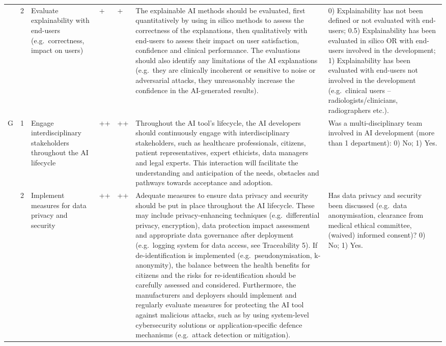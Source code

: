 \begin{landscape}
\begin{longtable}{@{}p{0.9cm}p{0.5cm}p{2.8cm}p{0.6cm}p{0.6cm}p{7.2cm}p{5.5cm}@{}}
	\addlinespace
	& 2 & Evaluate explainability with end-users (e.g.\ correctness, impact on users) & + & + & The explainable AI methods should be evaluated, first quantitatively by using in silico methods to assess the correctness of the explanations, then qualitatively with end-users to assess their impact on user satisfaction, confidence and clinical performance. The evaluations should also identify any limitations of the AI explanations (e.g.\ they are clinically incoherent or sensitive to noise or adversarial attacks, they unreasonably increase the confidence in the AI-generated results). & 0) Explainability has not been defined or not evaluated with end-users; 0.5) Explainability has been evaluated in silico OR with end-users involved in the development; 1) Explainability has been evaluated with end-users not involved in the development (e.g.\ clinical users -- radiologists/clinicians, radiographers etc.). \\
	\addlinespace
	G & 1 & Engage interdisciplinary stakeholders throughout the AI lifecycle & ++ & ++ & Throughout the AI tool's lifecycle, the AI developers should continuously engage with interdisciplinary stakeholders, such as healthcare professionals, citizens, patient representatives, expert ethicists, data managers and legal experts. This interaction will facilitate the understanding and anticipation of the needs, obstacles and pathways towards acceptance and adoption. & Was a multi-disciplinary team involved in AI development (more than 1 department): 0) No; 1) Yes. \\
	\addlinespace
	& 2 & Implement measures for data privacy and security & ++ & ++ & Adequate measures to ensure data privacy and security should be put in place throughout the AI lifecycle. These may include privacy-enhancing techniques (e.g.\ differential privacy, encryption), data protection impact assessment and appropriate data governance after deployment (e.g.\ logging system for data access, see Traceability 5). If de-identification is implemented (e.g.\ pseudonymisation, k-anonymity), the balance between the health benefits for citizens and the risks for re-identification should be carefully assessed and considered. Furthermore, the manufacturers and deployers should implement and regularly evaluate measures for protecting the AI tool against malicious attacks, such as by using system-level cybersecurity solutions or application-specific defence mechanisms (e.g.\ attack detection or mitigation). & Has data privacy and security been discussed (e.g.\ data anonymisation, clearance from medical ethical committee, (waived) informed consent)? 0) No; 1) Yes. \\

\end{longtable}
\end{landscape}
